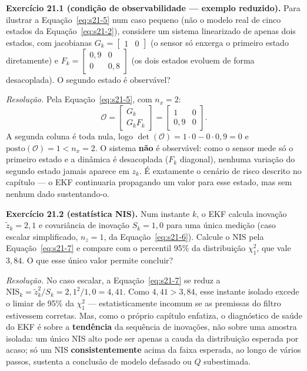 \documentclass[12pt,a4paper]{article}
\numberwithin{equation}{section}
\numberwithin{table}{section}
\numberwithin{figure}{section}
\begin{document}
{	\textbf{Exercício 21.1 (condição de observabilidade --- exemplo
	reduzido).} Para ilustrar a Equação~\eqref{eq:s21-5} num caso pequeno
	(não o modelo real de cinco estados da Equação~\eqref{eq:s21-2}),
	considere um sistema linearizado de apenas dois estados, com
	jacobianas $G_k = \begin{bmatrix}1 & 0\end{bmatrix}$ (o sensor só
	enxerga o primeiro estado diretamente) e
	$F_k = \begin{bmatrix}0{,}9 & 0\\ 0 & 0{,}8\end{bmatrix}$ (os dois
	estados evoluem de forma desacoplada). O segundo estado é observável?

	\emph{Resolução.} Pela Equação~\eqref{eq:s21-5}, com $n_x=2$:
	$$\mathcal{O} = \begin{bmatrix} G_k \\ G_k F_k \end{bmatrix}
	= \begin{bmatrix} 1 & 0 \\ 0{,}9 & 0 \end{bmatrix}.$$
	A segunda coluna é toda nula, logo
	$\det(\mathcal{O}) = 1\cdot 0 - 0\cdot 0{,}9 = 0$ e
	$\text{posto}(\mathcal{O}) = 1 < n_x = 2$. O sistema \textbf{não} é
	observável: como o sensor mede só o primeiro estado e a dinâmica é
	desacoplada ($F_k$ diagonal), nenhuma variação do segundo estado
	jamais aparece em $z_k$. É exatamente o cenário de risco descrito no
	capítulo --- o EKF continuaria propagando um valor para esse estado,
	mas sem nenhum dado sustentando-o.

	\textbf{Exercício 21.2 (estatística NIS).} Num instante $k$, o EKF
	calcula inovação $\tilde z_k = 2{,}1$ e covariância de inovação
	$S_k = 1{,}0$ para uma única medição (caso escalar simplificado,
	$n_z=1$, da Equação~\eqref{eq:s21-6}). Calcule o NIS pela
	Equação~\eqref{eq:s21-7} e compare com o percentil 95\% da
	distribuição $\chi^2_1$, que vale $3{,}84$. O que esse único valor
	permite concluir?

	\emph{Resolução.} No caso escalar, a Equação~\eqref{eq:s21-7} se
	reduz a $\text{NIS}_k = \tilde z_k^2 / S_k = 2{,}1^2/1{,}0 = 4{,}41$.
	Como $4{,}41 > 3{,}84$, esse instante isolado excede o limiar de
	95\% da $\chi^2_1$ --- estatisticamente incomum se as premissas do
	filtro estivessem corretas. Mas, como o próprio capítulo enfatiza, o
	diagnóstico de saúde do EKF é sobre a \textbf{tendência} da sequência
	de inovações, não sobre uma amostra isolada: um único NIS alto pode
	ser apenas a cauda da distribuição esperada por acaso; só um NIS
	\textbf{consistentemente} acima da faixa esperada, ao longo de vários
	passos, sustenta a conclusão de modelo defasado ou $Q$ subestimada.

}
\end{document}

